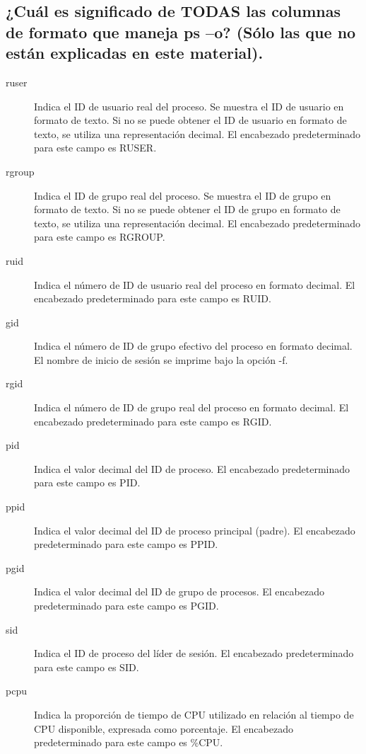 \documentclass[11pt]{article}
\begin{document}
\subsection{¿Cuál es significado de TODAS las columnas de formato que maneja ps –o? (Sólo las que no están explicadas en este material).}
\label{sec:org30d149b}
\autocite{ibm}
\begin{description}
\item[{ruser}] Indica el ID de usuario real del proceso. Se muestra el ID de usuario en formato de texto. Si no se puede obtener el ID de usuario en formato de texto, se utiliza una representación decimal. El encabezado predeterminado para este campo es RUSER.

\item[{rgroup}] Indica el ID de grupo real del proceso. Se muestra el ID de grupo en formato de texto. Si no se puede obtener el ID de grupo en formato de texto, se utiliza una representación decimal. El encabezado predeterminado para este campo es RGROUP.

\item[{ruid}] Indica el número de ID de usuario real del proceso en formato decimal. El encabezado predeterminado para este campo es RUID.

\item[{gid}] Indica el número de ID de grupo efectivo del proceso en formato decimal. El nombre de inicio de sesión se imprime bajo la opción -f.

\item[{rgid}] Indica el número de ID de grupo real del proceso en formato decimal. El encabezado predeterminado para este campo es RGID.

\item[{pid}] Indica el valor decimal del ID de proceso. El encabezado predeterminado para este campo es PID.

\item[{ppid}] Indica el valor decimal del ID de proceso principal (padre). El encabezado predeterminado para este campo es PPID.

\item[{pgid}] Indica el valor decimal del ID de grupo de procesos. El encabezado predeterminado para este campo es PGID.

\item[{sid}] Indica el ID de proceso del líder de sesión. El encabezado predeterminado para este campo es SID.

\item[{pcpu}] Indica la proporción de tiempo de CPU utilizado en relación al tiempo de CPU disponible, expresada como porcentaje. El encabezado predeterminado para este campo es \%CPU.


\end{description}
\end{document}
